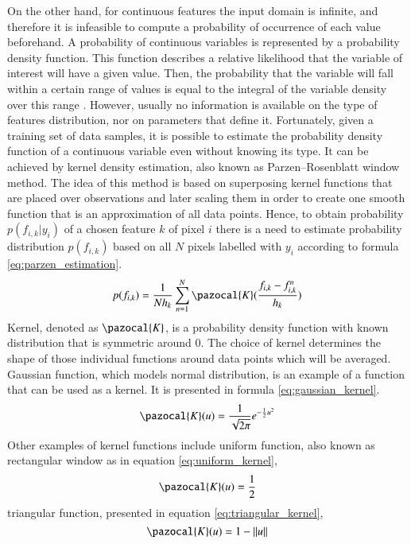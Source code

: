 On the other hand, for continuous features the input domain is infinite, and therefore it is infeasible to compute a probability of occurrence of each value beforehand. A probability of continuous variables is represented by a probability density function. This function describes a relative likelihood that the variable of interest will have a given value. Then, the probability that the variable will fall within a certain range of values is equal to the integral of the variable density over this range \cite{statistics}. However, usually no information is available on the type of features distribution, nor on parameters that define it. Fortunately, given a training set of data samples, it is possible to estimate the probability density function of a continuous variable even without knowing its type. It can be achieved by kernel density estimation, also known as Parzen–Rosenblatt window method. The idea of this method is based on superposing kernel functions that are placed over observations and later scaling them in order to create one smooth function that is an approximation of all data points. Hence, to obtain probability $p(f_{i,k}|y_i)$  of a chosen feature $k$ of pixel $i$ there is a need to estimate probability distribution $p(f_{i,k})$ based on all $N$ pixels labelled with $y_i$ according to formula \ref{eq:parzen_estimation}.
\begin{equation}
    \label{eq:parzen_estimation}
    p(f_{i,k}) = \frac{1}{Nh_k} \sum_{n=1}^{N} \pazocal{K} (\frac{f_{i,k} - f_{i,k}^{n}}{h_k})
\end{equation}
Kernel, denoted as $\pazocal{K}$, is a probability density function with known distribution that is symmetric around 0. The choice of kernel determines the shape of those individual functions around data points which will be averaged. Gaussian function, which models normal distribution, is an example of a function that can be used as a kernel. It is presented in formula \ref{eq:gaussian_kernel}.
\begin{equation}
    \label{eq:gaussian_kernel}
    \pazocal{K}(u) = \frac{1}{\sqrt{2\pi}}e^{-\frac{1}{2}u^2}
\end{equation}
Other examples of kernel functions include uniform function, also known as rectangular window as in equation \ref{eq:uniform_kernel},
\begin{equation}
    \label{eq:uniform_kernel}
    \pazocal{K}(u) = \frac{1}{2}
\end{equation}
triangular function, presented in equation \ref{eq:triangular_kernel},
\begin{equation}
    \label{eq:triangular_kernel}
    \pazocal{K}(u) = 1 - \left \| u \right \|
\end{equation}
